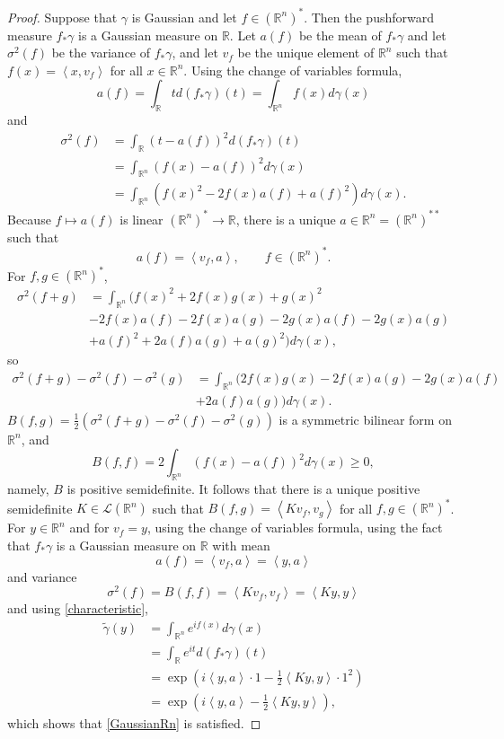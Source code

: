 \documentclass{article}
\newcommand{\inner}[2]{\left\langle #1, #2 \right\rangle}
\theoremstyle{definition}
\begin{document}
\begin{proof}
Suppose that  $\gamma$ is Gaussian and let  $f \in (\mathbb{R}^n)^*$.  Then the pushforward
measure $f_* \gamma$ is a Gaussian measure on $\mathbb{R}$. Let
$a(f)$ be the mean of $f_* \gamma$ and let $\sigma^2(f)$ be the variance of $f_* \gamma$, and
 let $v_f$ be the unique element of $\mathbb{R}^n$ such that
$f(x) = \inner{x}{v_f}$ for all $x \in \mathbb{R}^n$. 
Using the change of variables formula,
\[
a(f) = \int_{\mathbb{R}} t d(f_* \gamma)(t) = 
\int_{\mathbb{R}^n} f(x) d\gamma(x)
\]
and
\begin{align*}
\sigma^2(f) &= \int_{\mathbb{R}} (t-a(f))^2 d(f_* \gamma)(t)\\
&=\int_{\mathbb{R}^n} (f(x)-a(f))^2 d\gamma(x)\\
&=\int_{\mathbb{R}^n} (f(x)^2-2f(x) a(f) + a(f)^2) d\gamma(x).
\end{align*}
Because $f \mapsto a(f)$ is linear $(\mathbb{R}^n)^* \to \mathbb{R}$, there is a unique
$a \in \mathbb{R}^n = (\mathbb{R}^n)^{**}$ such that
\[
a(f) = \inner{v_f}{a}, \qquad f \in (\mathbb{R}^n)^*.
\]
For $f,g \in (\mathbb{R}^n)^*$,
\begin{align*}
\sigma^2(f+g)&=\int_{\mathbb{R}^n} (f(x)^2+2f(x)g(x)+g(x)^2\\
&-2f(x)a(f)-2f(x)a(g)-2g(x)a(f)-2g(x)a(g) \\
&+a(f)^2+2a(f)a(g)+a(g)^2) d\gamma(x),
\end{align*}
so
\begin{align*}
\sigma^2(f+g)-\sigma^2(f)-\sigma^2(g)&=\int_{\mathbb{R}^n}  (2f(x)g(x)-2f(x)a(g)-2g(x)a(f)\\
&+2a(f)a(g)) d\gamma(x).
\end{align*}
 $B(f,g) = \frac{1}{2}(\sigma^2(f+g)-\sigma^2(f)-\sigma^2(g))$ is a symmetric bilinear form on $\mathbb{R}^n$, and
 \[
 B(f,f) = 2 \int_{\mathbb{R}^n} (f(x)-a(f))^2 d\gamma(x) \geq 0,
 \]
 namely, $B$ is positive semidefinite. It follows  that there is a unique positive semidefinite $K \in \mathscr{L}(\mathbb{R}^n)$ such that
 $B(f,g) = \inner{Kv_f}{v_g}$ for all $f,g \in (\mathbb{R}^n)^*$. 
 For $y \in \mathbb{R}^n$ and for $v_f=y$,  using the change of variables formula, using the fact that
 $f_* \gamma$ is a Gaussian measure on $\mathbb{R}$ with
 mean
\[
a(f) = \inner{v_f}{a} = \inner{y}{a}
\]
and variance
\[
\sigma^2(f) = B(f,f) = \inner{Kv_f}{v_f} = \inner{Ky}{y}
\]
 and  using \eqref{characteristic},
 \begin{align*}
 \widetilde{\gamma}(y)&=\int_{\mathbb{R}^n} e^{if(x)} d\gamma(x)\\
 &=\int_{\mathbb{R}} e^{it} d(f_*\gamma)(t)\\
 &=\exp\left(i\inner{y}{a}\cdot 1 - \frac{1}{2} \inner{Ky}{y}\cdot 1^2 \right)\\
 &=\exp\left(i\inner{y}{a}  - \frac{1}{2} \inner{Ky}{y} \right),
 \end{align*}
 which shows that \eqref{GaussianRn} is satisfied.
 

\end{proof}
\end{document}
